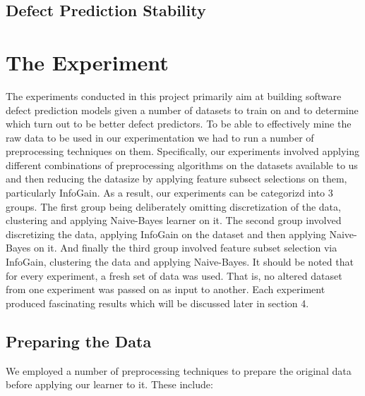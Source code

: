 \documentclass{sig-alternate}
\begin{document}
\subsection{Defect Prediction Stability}



\section{The Experiment}
The experiments conducted in this project primarily aim at building software defect prediction models given a number of datasets to train on and to determine which turn out to be better defect predictors. To be able to effectively mine the raw data to be used in our experimentation we had to run a number of preprocessing techniques on them. Specifically, our experiments involved applying different combinations of preprocessing algorithms on the datasets available to us and then reducing the datasize by applying feature subsect selections on them, particularly InfoGain. As a result, our experiments can be categorizd into 3 groups. The first group being deliberately omitting discretization of the data, clustering and applying Naive-Bayes learner on it. The second group involved discretizing the data, applying InfoGain on the dataset and then applying Naive-Bayes on it. And finally the third group involved feature subset selection via InfoGain, clustering the data and applying Naive-Bayes. It should be noted that for every experiment, a fresh set of data was used. That is, no altered dataset from one experiment was passed on as input to another. Each experiment produced fascinating results which will be discussed later in section 4.

\subsection{Preparing the Data}
We employed a number of preprocessing techniques to prepare the original data before applying our learner to it. These include:
\end{document}
